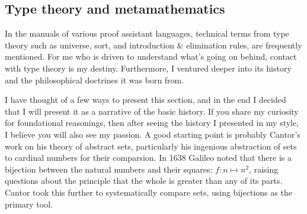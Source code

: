 \documentclass[10pt]{article}
\begin{document}
\subsection{Type theory and metamathematics}
In the manuals of various proof assistant languages, technical terms from type
theory such as universe, sort, and introduction \& elimination rules, are
frequently mentioned. For me who is driven to understand what's going on
behind, contact with type theory is my destiny. Furthermore, I ventured deeper
into its history and the philosophical doctrines it was born from.

I have thought of a few ways to present this section, and in the end I decided
that I will present it as a narrative of the basic history. If you share my
curiosity for foundational reasonings, then after seeing the history I
presented in my style, I believe you will also see my passion.  A good starting
point is probably Cantor's work on his theory of abstract sets, particularly
his ingenious abstraction of sets to cardinal numbers for their comparsion.  In
1638 Galileo noted that there is a bijection between the natural numbers and
their squares: $f : n \mapsto n^2$, raising questions about the principle that
the whole is greater than any of its parts. Cantor took this further to
systematically compare sets, using bijections as the primary tool. 
\end{document}
